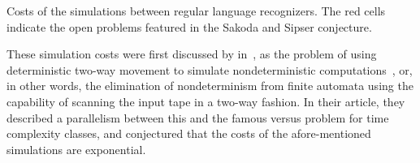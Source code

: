 \begin{table}
	\centering
	\caption[Costs of the simulations between regular language recognizers.]{Costs of the simulations between regular language recognizers.
		The red cells indicate the open problems featured in the Sakoda and Sipser conjecture.}
	\label{tab:sims-core-general-context}
\end{table}

These simulation costs were first discussed by \citeauthor{SakSip78} in~\citeyear{SakSip78}, as the problem of using deterministic two-way movement to simulate nondeterministic computations~\cite{SakSip78}, or, in other words, the elimination of nondeterminism from finite automata using the capability of scanning the input tape in a two-way fashion.
In their article, they described a parallelism between this and the famous \cP versus \cNP problem for time complexity classes, and conjectured that the costs of the afore-mentioned simulations are exponential.

